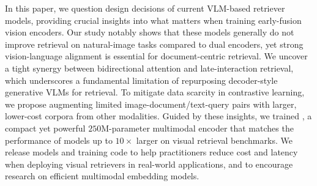 




In this paper, we question design decisions of current VLM-based retriever models, providing crucial insights into what matters when training early-fusion vision encoders. Our study notably shows that these models generally do not improve retrieval on natural-image tasks compared to dual encoders, yet strong vision-language alignment is essential for document-centric retrieval. We uncover a tight synergy between bidirectional attention and late-interaction retrieval, which underscores a fundamental limitation of repurposing decoder-style generative VLMs for retrieval. To mitigate data scarcity in contrastive learning, we propose augmenting limited image-document/text-query pairs with larger, lower-cost corpora from other modalities. Guided by these insights, we trained \colflagship{}, a compact yet powerful $250$M-parameter multimodal encoder that matches the performance of models up to $10\times$ larger on visual retrieval benchmarks. We release models and training code to help practitioners reduce cost and latency when deploying visual retrievers in real-world applications, and to encourage research on efficient multimodal embedding models.

